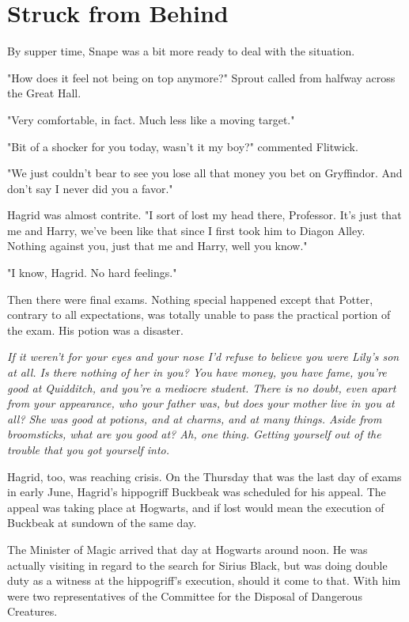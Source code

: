 
\chapter{Struck from Behind}


By supper time, Snape was a bit more ready to deal with the situation.

"How does it feel not being on top anymore?" Sprout called from halfway across the Great Hall.

"Very comfortable, in fact. Much less like a moving target."

"Bit of a shocker for you today, wasn't it my boy?" commented Flitwick.

"We just couldn't bear to see you lose all that money you bet on Gryffindor. And don't say I never did you a favor."

Hagrid was almost contrite. "I sort of lost my head there, Professor. It's just that me and Harry, we've been like that since I first took him to Diagon Alley. Nothing against you, just that me and Harry, well you know."

"I know, Hagrid. No hard feelings."

Then there were final exams. Nothing special happened except that Potter, contrary to all expectations, was totally unable to pass the practical portion of the exam. His potion was a disaster.

\emph{If it weren't for your eyes and your nose I'd refuse to believe you were Lily's son at all. Is there nothing of her in you? You have money, you have fame, you're good at Quidditch, and you're a mediocre student. There is no doubt, even apart from your appearance, who your father was, but does your mother live in you at all? She was good at potions, and at charms, and at many things. Aside from broomsticks, what are you good at? Ah, one thing. Getting yourself out of the trouble that you got yourself into.}

Hagrid, too, was reaching crisis. On the Thursday that was the last day of exams in early June, Hagrid's hippogriff Buckbeak was scheduled for his appeal. The appeal was taking place at Hogwarts, and if lost would mean the execution of Buckbeak at sundown of the same day.

The Minister of Magic arrived that day at Hogwarts around noon. He was actually visiting in regard to the search for Sirius Black, but was doing double duty as a witness at the hippogriff's execution, should it come to that. With him were two representatives of the Committee for the Disposal of Dangerous Creatures.

